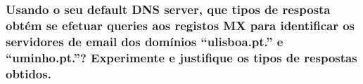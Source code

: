 \subsubsection{Usando o seu default DNS server, que tipos de resposta obtém se efetuar queries aos registos
MX para identificar os servidores de email dos domínios “ulisboa.pt.” e “uminho.pt.”?
Experimente e justifique os tipos de respostas obtidos.}

\begin{figure}[h!]
    \centering
    \qquad
\end{figure}